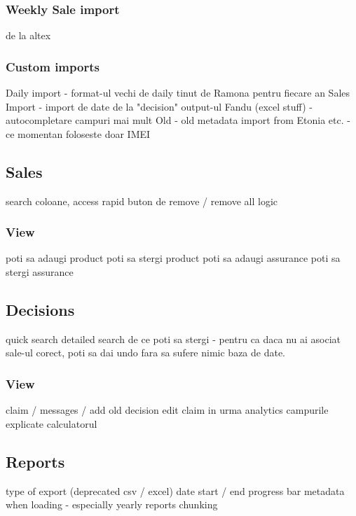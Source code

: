 		\subsubsection{Weekly Sale import}
			de la altex
		\subsubsection{Custom imports}
			Daily import - format-ul vechi de daily tinut de Ramona pentru fiecare an
			Sales Import - import de date de la "decision" output-ul Fandu (excel stuff) - autocompletare campuri mai mult
			Old - old metadata import from Etonia etc. - ce momentan foloseste doar IMEI
	\subsection{Sales}
		search coloane, access rapid
		buton de remove / remove all logic
		\subsubsection{View}
				poti sa adaugi product
				poti sa stergi product
				poti sa adaugi assurance
				poti sa stergi assurance
	\subsection{Decisions}
		quick search
		detailed search
		de ce poti sa stergi - pentru ca daca nu ai asociat sale-ul corect, poti sa dai undo fara sa sufere nimic baza de date.
		\subsubsection{View}
				claim / messages / add old decision
				edit claim in urma analytics
				campurile explicate
				calculatorul
	\subsection{Reports}
		type of export (deprecated csv / excel)
		date start / end
		progress bar
		metadata when loading - especially yearly reports
		chunking

